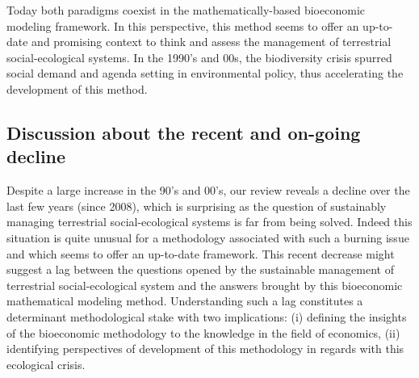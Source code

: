 Today both paradigms coexist in the mathematically-based bioeconomic modeling framework. In this perspective, this method seems to offer an up-to-date and promising context to think and assess the management of terrestrial social-ecological systems. In the 1990's and 00s, the biodiversity crisis spurred social demand and agenda setting in environmental policy, thus accelerating the development of this method.

\subsection{Discussion about the recent and on-going decline}

Despite a large increase in the 90's and 00's, our review reveals a decline over the last few years (since 2008), which is surprising as the question of sustainably managing terrestrial social-ecological systems is far from being solved. Indeed this situation is quite unusual for a methodology associated with such a burning issue and which seems to offer an up-to-date framework. 
 This recent decrease might suggest a lag between the questions opened by the sustainable management of terrestrial social-ecological system and the answers brought by this bioeconomic mathematical modeling method. Understanding such a lag constitutes a determinant methodological stake with two implications: (i) defining the insights of the bioeconomic methodology to the knowledge in the field of economics, (ii) identifying perspectives of development of this methodology in regards with this ecological crisis.
 
